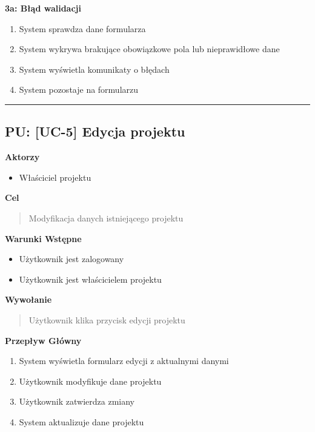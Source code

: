 \textbf{3a: Błąd walidacji}
\begin{enumerate}
    \item System sprawdza dane formularza
    \item System wykrywa brakujące obowiązkowe pola lub nieprawidłowe dane
    \item System wyświetla komunikaty o błędach
    \item System pozostaje na formularzu
\end{enumerate}


\hrule
\vspace{1cm}

\subsection*{PU: [UC-5] Edycja projektu}

\noindent\textbf{Aktorzy}
\begin{itemize}
    \item Właściciel projektu
\end{itemize}

\vspace{0.2cm}
\noindent\textbf{Cel}
\begin{quote}
    Modyfikacja danych istniejącego projektu
\end{quote}

\vspace{0.2cm}
\noindent\textbf{Warunki Wstępne}
\begin{itemize}
    \item Użytkownik jest zalogowany
    \item Użytkownik jest właścicielem projektu
\end{itemize}

\vspace{0.2cm}
\noindent\textbf{Wywołanie}
\begin{quote}
    Użytkownik klika przycisk edycji projektu
\end{quote}

\vspace{0.2cm}
\noindent\textbf{Przepływ Główny}
\begin{enumerate}
    \item System wyświetla formularz edycji z aktualnymi danymi
    \item Użytkownik modyfikuje dane projektu
    \item Użytkownik zatwierdza zmiany
    \item System aktualizuje dane projektu
\end{enumerate}

